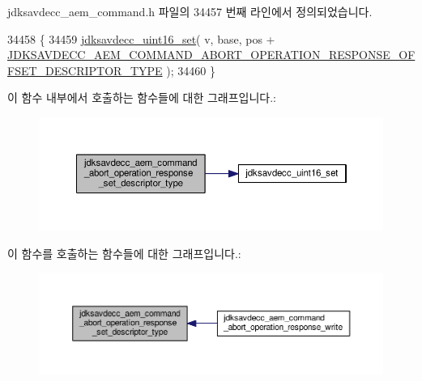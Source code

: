 jdksavdecc\+\_\+aem\+\_\+command.\+h 파일의 34457 번째 라인에서 정의되었습니다.


\begin{DoxyCode}
34458 \{
34459     \hyperlink{group__endian_ga14b9eeadc05f94334096c127c955a60b}{jdksavdecc\_uint16\_set}( v, base, pos + 
      \hyperlink{group__command__abort__operation__response_ga0bdad4aae091fcbfcebd5ec8cef08930}{JDKSAVDECC\_AEM\_COMMAND\_ABORT\_OPERATION\_RESPONSE\_OFFSET\_DESCRIPTOR\_TYPE}
       );
34460 \}
\end{DoxyCode}


이 함수 내부에서 호출하는 함수들에 대한 그래프입니다.\+:
\nopagebreak
\begin{figure}[H]
\begin{center}
\leavevmode
\includegraphics[width=350pt]{group__command__abort__operation__response_ga20e3e13b6dd93c2d0ebfe7d35ba8eda8_cgraph}
\end{center}
\end{figure}




이 함수를 호출하는 함수들에 대한 그래프입니다.\+:
\nopagebreak
\begin{figure}[H]
\begin{center}
\leavevmode
\includegraphics[width=350pt]{group__command__abort__operation__response_ga20e3e13b6dd93c2d0ebfe7d35ba8eda8_icgraph}
\end{center}
\end{figure}


